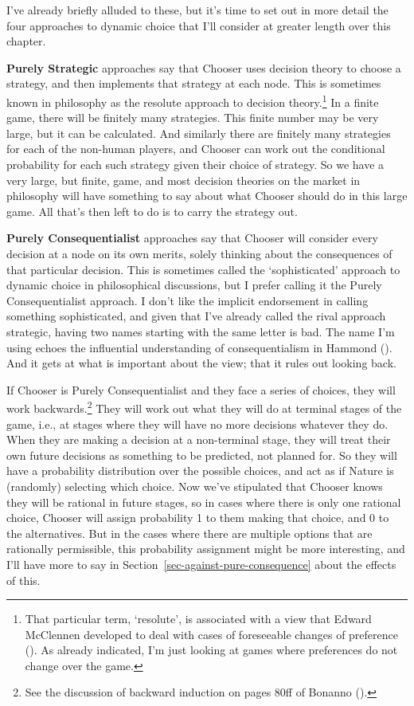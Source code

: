 \documentclass[
  12pt,
  letterpaper,
  DIV=11,
  numbers=noendperiod]{scrreprt}
\begin{document}
I've already briefly alluded to these, but it's time to set out in more
detail the four approaches to dynamic choice that I'll consider at
greater length over this chapter.

\textbf{Purely Strategic} approaches say that Chooser uses decision
theory to choose a strategy, and then implements that strategy at each
node. This is sometimes known in philosophy as the resolute approach to
decision theory.\footnote{That particular term, `resolute', is
  associated with a view that Edward McClennen developed to deal with
  cases of foreseeable changes of preference
  (). As already indicated,
  I'm just looking at games where preferences do not change over the
  game.} In a finite game, there will be finitely many strategies. This
finite number may be very large, but it can be calculated. And similarly
there are finitely many strategies for each of the non-human players,
and Chooser can work out the conditional probability for each such
strategy given their choice of strategy. So we have a very large, but
finite, game, and most decision theories on the market in philosophy
will have something to say about what Chooser should do in this large
game. All that's then left to do is to carry the strategy out.

\textbf{Purely Consequentialist} approaches say that Chooser will
consider every decision at a node on its own merits, solely thinking
about the consequences of that particular decision. This is sometimes
called the `sophisticated' approach to dynamic choice in philosophical
discussions, but I prefer calling it the Purely Consequentialist
approach. I don't like the implicit endorsement in calling something
sophisticated, and given that I've already called the rival approach
strategic, having two names starting with the same letter is bad. The
name I'm using echoes the influential understanding of consequentialism
in Hammond (). And it gets at what is
important about the view; that it rules out looking back.

If Chooser is Purely Consequentialist and they face a series of choices,
they will work backwards.\footnote{See the discussion of backward
  induction on pages 80ff of Bonanno ().}
They will work out what they will do at terminal stages of the game,
i.e., at stages where they will have no more decisions whatever they do.
When they are making a decision at a non-terminal stage, they will treat
their own future decisions as something to be predicted, not planned
for. So they will have a probability distribution over the possible
choices, and act as if Nature is (randomly) selecting which choice. Now
we've stipulated that Chooser knows they will be rational in future
stages, so in cases where there is only one rational choice, Chooser
will assign probability 1 to them making that choice, and 0 to the
alternatives. But in the cases where there are multiple options that are
rationally permissible, this probability assignment might be more
interesting, and I'll have more to say in
Section~\ref{sec-against-pure-consequence} about the effects of this.
\end{document}
